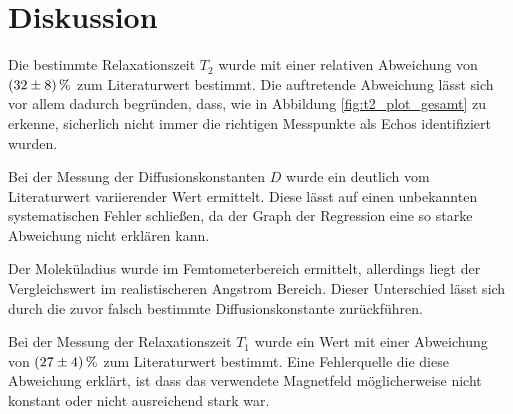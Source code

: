\section{Diskussion}
\label{sec:Diskussion}

Die bestimmte Relaxationszeit $T_{2}$ wurde mit einer relativen Abweichung von $\SI{32+-8}{\percent}$ zum Literaturwert bestimmt. Die auftretende Abweichung lässt sich vor allem dadurch begründen, dass, wie in Abbildung \ref{fig:t2_plot_gesamt}
zu erkenne, sicherlich nicht immer die richtigen Messpunkte als Echos identifiziert wurden.

Bei der Messung der Diffusionskonstanten $D$ wurde ein deutlich vom Literaturwert variierender Wert ermittelt. Diese lässt auf einen unbekannten systematischen Fehler schließen, da der Graph der Regression eine so starke
Abweichung nicht erklären kann.

Der Moleküladius wurde im Femtometerbereich ermittelt, allerdings liegt der Vergleichswert im realistischeren Angstrom Bereich. Dieser Unterschied lässt sich durch die
zuvor falsch bestimmte Diffusionskonstante zurückführen.

Bei der Messung der Relaxationszeit $T_{1}$ wurde ein Wert mit einer Abweichung von $\SI{27+-4}{\percent}$ zum Literaturwert bestimmt.
Eine Fehlerquelle die diese Abweichung erklärt, ist dass das verwendete Magnetfeld möglicherweise nicht konstant oder nicht ausreichend stark war.
